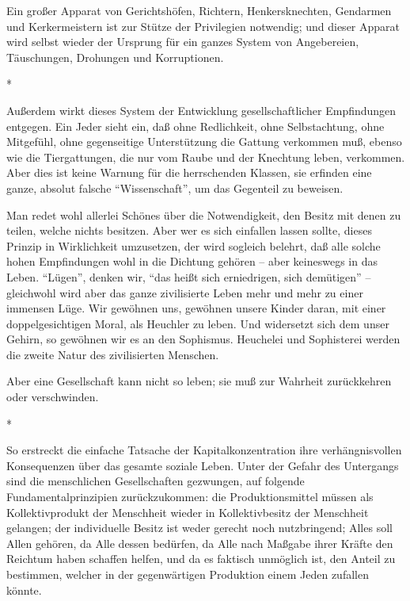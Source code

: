 \documentclass{scrbook}
\begin{document}
Ein großer Apparat von Gerichtshöfen, Richtern, Henkersknechten, Gendarmen und Kerkermeistern ist zur Stütze der Privilegien notwendig; und dieser Apparat wird selbst wieder der Ursprung für ein ganzes System von Angebereien, Täuschungen, Drohungen und Korruptionen.

\begin{center}*\end{center}

Außerdem wirkt dieses System der Entwicklung gesellschaftlicher Empfindungen entgegen. Ein Jeder sieht ein, daß ohne Redlichkeit, ohne Selbstachtung, ohne Mitgefühl, ohne gegenseitige Unterstützung die Gattung verkommen muß, ebenso wie die Tiergattungen, die nur vom Raube und der Knechtung leben, verkommen. Aber dies ist keine Warnung für die herrschenden Klassen, sie erfinden eine ganze, absolut falsche ``Wissenschaft'', um das Gegenteil zu beweisen.

Man redet wohl allerlei Schönes über die Notwendigkeit, den Besitz mit denen zu teilen, welche nichts besitzen. Aber wer es sich einfallen lassen sollte, dieses Prinzip in Wirklichkeit umzusetzen, der wird sogleich belehrt, daß alle solche hohen Empfindungen wohl in die Dichtung gehören – aber keineswegs in das Leben. ``Lügen'', denken wir, ``das heißt sich erniedrigen, sich demütigen'' – gleichwohl wird aber das ganze zivilisierte Leben mehr und mehr zu einer immensen Lüge. Wir gewöhnen uns, gewöhnen unsere Kinder daran, mit einer doppelgesichtigen Moral, als Heuchler zu leben. Und widersetzt sich dem unser Gehirn, so gewöhnen wir es an den Sophismus. Heuchelei und Sophisterei werden die zweite Natur des zivilisierten Menschen.

Aber eine Gesellschaft kann nicht so leben; sie muß zur Wahrheit zurückkehren oder verschwinden.

\begin{center}*\end{center}

So erstreckt die einfache Tatsache der Kapitalkonzentration ihre verhängnisvollen Konsequenzen über das gesamte soziale Leben. Unter der Gefahr des Untergangs sind die menschlichen Gesellschaften gezwungen, auf folgende Fundamentalprinzipien zurückzukommen: die Produktionsmittel müssen als Kollektivprodukt der Menschheit wieder in Kollektivbesitz der Menschheit gelangen; der individuelle Besitz ist weder gerecht noch nutzbringend; Alles soll Allen gehören, da Alle dessen bedürfen, da Alle nach Maßgabe ihrer Kräfte den Reichtum haben schaffen helfen, und da es faktisch unmöglich ist, den Anteil zu bestimmen, welcher in der gegenwärtigen Produktion einem Jeden zufallen könnte.
\end{document}
